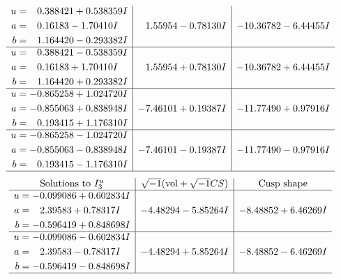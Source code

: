\documentclass[1p]{elsarticle_modified}
\theoremstyle{definition}
\newcommand{\I}{\sqrt{-1}}
\begin{document}
$$\begin{array}{c|c|c}
\begin{aligned}
u &= \phantom{-}0.388421 + 0.538359 I \\
a &= \phantom{-}0.16183 - 1.70410 I \\
b &= \phantom{-}1.164420 - 0.293382 I\end{aligned}
 & \phantom{-}1.55954 - 0.78130 I & -10.36782 - 6.44455 I \\ \hline\begin{aligned}
u &= \phantom{-}0.388421 - 0.538359 I \\
a &= \phantom{-}0.16183 + 1.70410 I \\
b &= \phantom{-}1.164420 + 0.293382 I\end{aligned}
 & \phantom{-}1.55954 + 0.78130 I & -10.36782 + 6.44455 I \\ \hline\begin{aligned}
u &= -0.865258 + 1.024720 I \\
a &= -0.855063 + 0.838948 I \\
b &= \phantom{-}0.193415 + 1.176310 I\end{aligned}
 & -7.46101 + 0.19387 I & -11.77490 + 0.97916 I \\ \hline\begin{aligned}
u &= -0.865258 - 1.024720 I \\
a &= -0.855063 - 0.838948 I \\
b &= \phantom{-}0.193415 - 1.176310 I\end{aligned}
 & -7.46101 - 0.19387 I & -11.77490 - 0.97916 I\\
 \hline 
 \end{array}$$\newpage$$\begin{array}{c|c|c}  
\text{Solutions to }I^u_{3}& \I (\text{vol} + \sqrt{-1}CS) & \text{Cusp shape}\\
 \hline 
\begin{aligned}
u &= -0.099086 + 0.602834 I \\
a &= \phantom{-}2.39583 + 0.78317 I \\
b &= -0.596419 + 0.848698 I\end{aligned}
 & -4.48294 - 5.85264 I & -8.48852 + 6.46269 I \\ \hline\begin{aligned}
u &= -0.099086 - 0.602834 I \\
a &= \phantom{-}2.39583 - 0.78317 I \\
b &= -0.596419 - 0.848698 I\end{aligned}
 & -4.48294 + 5.85264 I & -8.48852 - 6.46269 I\\
 \hline 
 \end{array}$$\newpage\newpage\renewcommand{\arraystretch}{1}
\end{document}
